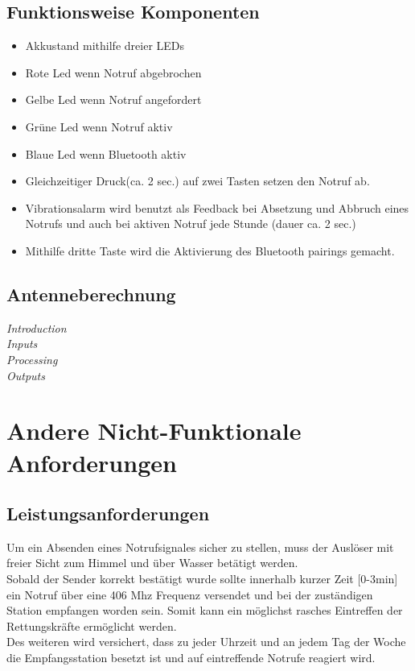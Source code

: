 \subsection{Funktionsweise Komponenten}
\begin{itemize}
	\item Akkustand mithilfe dreier LEDs
	\item Rote Led wenn Notruf abgebrochen
	\item Gelbe Led wenn Notruf angefordert
	\item Grüne Led wenn Notruf aktiv
	\item Blaue Led wenn Bluetooth aktiv
	\item Gleichzeitiger Druck(ca. 2 sec.) auf zwei Tasten setzen den Notruf ab.
	\item Vibrationsalarm wird benutzt als Feedback bei Absetzung und Abbruch eines Notrufs und auch bei aktiven Notruf jede Stunde (dauer ca. 2 sec.)
	\item Mithilfe dritte Taste wird die Aktivierung des Bluetooth pairings gemacht.
\end{itemize}
\subsection{Antenneberechnung}


\noindent \textit{\large Introduction} \\
\textit{\large Inputs} \\
\textit{\large Processing} \\
\textit{\large Outputs} \\

\newpage

\section{Andere Nicht-Funktionale Anforderungen}

\subsection{Leistungsanforderungen}
Um ein Absenden eines Notrufsignales sicher zu stellen, muss der Auslöser mit freier Sicht zum Himmel und über Wasser
betätigt werden. \\
Sobald der Sender korrekt bestätigt wurde sollte innerhalb kurzer Zeit [0-3min] ein Notruf über
eine 406 Mhz Frequenz versendet und bei der zuständigen Station empfangen worden sein. Somit kann ein möglichst rasches Eintreffen der Rettungskräfte ermöglicht werden.\\
Des weiteren wird versichert, dass zu jeder Uhrzeit und an jedem Tag der Woche die Empfangsstation besetzt ist und 
auf eintreffende Notrufe reagiert wird.

